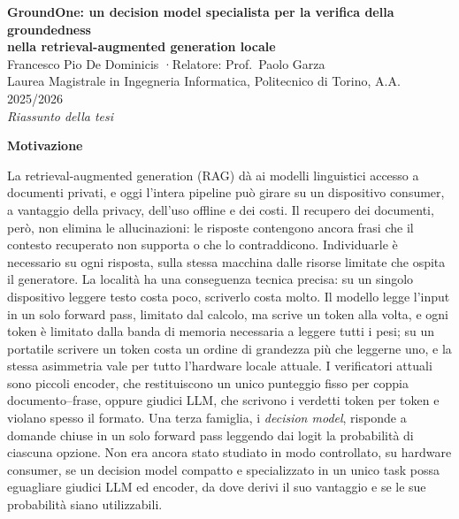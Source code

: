 \documentclass[11pt,a4paper]{article}
\newcommand{\sect}[1]{\par\medskip\noindent\textbf{\large #1}\par\smallskip}
\begin{document}
\begin{center}
{\Large\bfseries GroundOne: un decision model specialista per la verifica della groundedness\\ nella retrieval-augmented generation locale}\\[6pt]
{\normalsize Francesco Pio De Dominicis \quad·\quad Relatore: Prof.\ Paolo Garza\\
Laurea Magistrale in Ingegneria Informatica, Politecnico di Torino, A.A. 2025/2026}\\[4pt]
\textit{Riassunto della tesi}
\end{center}

\sect{Motivazione}
La retrieval-augmented generation (RAG) dà ai modelli linguistici accesso a documenti privati, e oggi l'intera pipeline
può girare su un dispositivo consumer, a vantaggio della privacy, dell'uso offline e dei costi. Il recupero dei documenti,
però, non elimina le allucinazioni: le risposte contengono ancora frasi che il contesto recuperato non supporta o che lo
contraddicono. Individuarle è necessario su ogni risposta, sulla stessa macchina dalle risorse limitate che ospita il
generatore. La località ha una conseguenza tecnica precisa: su un singolo dispositivo leggere testo costa poco, scriverlo
costa molto. Il modello legge l'input in un solo forward pass, limitato dal calcolo, ma scrive un token alla volta, e ogni
token è limitato dalla banda di memoria necessaria a leggere tutti i pesi; su un portatile scrivere un token costa un
ordine di grandezza più che leggerne uno, e la stessa asimmetria vale per tutto l'hardware locale attuale. I verificatori
attuali sono piccoli encoder, che restituiscono un unico punteggio fisso per coppia documento–frase, oppure giudici LLM,
che scrivono i verdetti token per token e violano spesso il formato. Una terza famiglia, i \emph{decision model}, risponde
a domande chiuse in un solo forward pass leggendo dai logit la probabilità di ciascuna opzione. Non era ancora stato
studiato in modo controllato, su hardware consumer, se un decision model compatto e specializzato in un unico task possa
eguagliare giudici LLM ed encoder, da dove derivi il suo vantaggio e se le sue probabilità siano utilizzabili.
\end{document}
